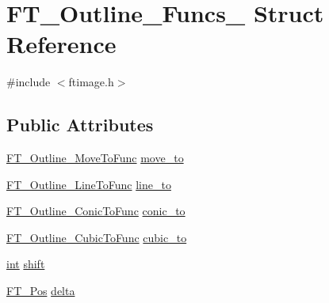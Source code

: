 \hypertarget{struct_f_t___outline___funcs__}{\section{F\-T\-\_\-\-Outline\-\_\-\-Funcs\-\_\- Struct Reference}
\label{struct_f_t___outline___funcs__}
}


{\ttfamily \#include $<$ftimage.\-h$>$}

\subsection*{Public Attributes}
\begin{DoxyCompactItemize}
\item 
\hyperlink{ftimage_8h_a2f06f3814eceacfecafe3c9b47b12c17}{F\-T\-\_\-\-Outline\-\_\-\-Move\-To\-Func} \hyperlink{struct_f_t___outline___funcs___abd53463a59a1ae2c6998e619c2ab6a65}{move\-\_\-to}
\item 
\hyperlink{ftimage_8h_aada4137385ebf457568a5117a65f1a52}{F\-T\-\_\-\-Outline\-\_\-\-Line\-To\-Func} \hyperlink{struct_f_t___outline___funcs___a876fc8ca7541786cd3c4ec3806f88360}{line\-\_\-to}
\item 
\hyperlink{ftimage_8h_a717a12451720685e6937b3fa00abeaa6}{F\-T\-\_\-\-Outline\-\_\-\-Conic\-To\-Func} \hyperlink{struct_f_t___outline___funcs___a09681f5a64189066d3fba3cf398a135b}{conic\-\_\-to}
\item 
\hyperlink{ftimage_8h_a757e69f6e4e29ff8e30407573fc68d50}{F\-T\-\_\-\-Outline\-\_\-\-Cubic\-To\-Func} \hyperlink{struct_f_t___outline___funcs___aa3e0c1bacb181a5f43c104ab7f72cfda}{cubic\-\_\-to}
\item 
\hyperlink{wglew_8h_a500a82aecba06f4550f6849b8099ca21}{int} \hyperlink{struct_f_t___outline___funcs___a540c246669b21b86cb405b3d9019cfda}{shift}
\item 
\hyperlink{ftimage_8h_af5f230f4b253d4c7715fd2e595614c90}{F\-T\-\_\-\-Pos} \hyperlink{struct_f_t___outline___funcs___a3c3121398b3ff564b4f3fd5b2a318e5e}{delta}
\end{DoxyCompactItemize}


